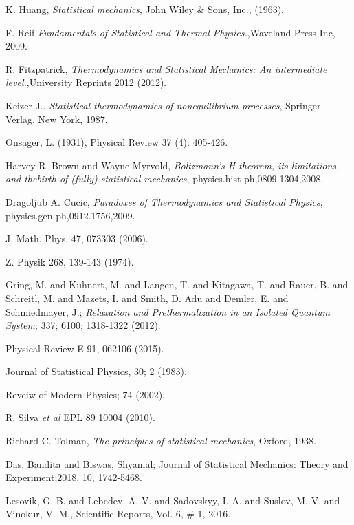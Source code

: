 \documentclass{article}
\begin{document}
\begin{thebibliography}{}


K. Huang, \emph{Statistical mechanics}, John Wiley \& Sons, Inc., (1963).

F. Reif {\it Fundamentals of Statistical and Thermal Physics.},Waveland Press Inc, 2009.

R. Fitzpatrick, {\it Thermodynamics and Statistical Mechanics: An intermediate level.},University Reprints 2012 (2012).

Keizer J., \emph{Statistical thermodynamics of nonequilibrium processes}, Springer-Verlag, New York, 1987.

Onsager, L. (1931), Physical Review 37 (4): 405-426.

Harvey R. Brown and Wayne Myrvold, {\it Boltzmann's H-theorem, its limitations, and thebirth of (fully) statistical mechanics}, physics.hist-ph,0809.1304,2008.

Dragoljub A. Cucic, {\it Paradoxes of Thermodynamics and Statistical Physics}, physics.gen-ph,0912.1756,2009.

J. Math. Phys. 47, 073303 (2006).

Z. Physik 268, 139-143 (1974).

Gring, M. and Kuhnert, M. and Langen, T. and Kitagawa, T. and Rauer, B. and Schreitl, M. and Mazets, I. and Smith, D. Adu and Demler, E. and Schmiedmayer, J.; {\it Relaxation and Prethermalization in an Isolated Quantum System}; 337; 6100; 1318-1322 (2012).

Physical Review E 91, 062106 (2015).

Journal of Statistical Physics, 30; 2 (1983).

Reveiw of Modern Physics; 74 (2002).

R. Silva {\it et al} EPL 89 10004 (2010).



 Richard C. Tolman, \emph{The principles of statistical mechanics}, Oxford, 1938.

Das, Bandita and Biswas, Shyamal; Journal of Statistical Mechanics: Theory and Experiment;2018, 10, 1742-5468. 

Lesovik, G. B. and Lebedev, A. V. and Sadovskyy, I. A. and Suslov, M. V. and Vinokur, V. M., Scientific Reports, Vol. 6, \# 1, 2016.




\end{thebibliography}{}
\end{document}

